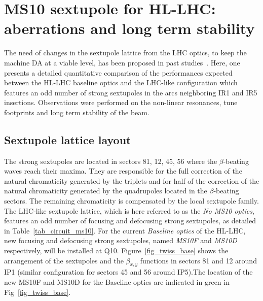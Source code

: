 \documentclass{cernatsnote}
\begin{document}
\section{MS10 sextupole for HL-LHC: aberrations and long term stability} \label{ms10}

The need of changes in the sextupole lattice from the LHC optics, to keep the machine DA at a viable level, has been proposed in past studies~\cite{ats,slhcv3,ms10_ppt1,ms10_ppt2}. Here, one presents a detailed quantitative comparison of the performances expected between the HL-LHC baseline optics and the LHC-like configuration which features an odd number of strong sextupoles in the arcs neighboring IR1 and IR5 insertions. Observations were performed on the non-linear resonances, tune footprints and long term stability of the beam.

\subsection{Sextupole lattice layout}

The strong sextupoles are located in sectors 81, 12, 45, 56 where the $\beta$-beating waves reach their maxima. They are responsible for the full correction of the natural chromaticity generated by the triplets and for half of the correction of the natural chromaticity generated by the quadrupoles located in the $\beta$-beating sectors. The remaining chromaticity is compensated by the local sextupole family. The LHC-like sextupole lattice, which is here referred to as the \textit{No MS10 optics}, features an odd number of focusing and defocusing strong sextupoles, as detailed in Table~\ref{tab_circuit_ms10}. For the current \textit{Baseline optics} of the HL-LHC, new focusing and defocusing strong sextupoles, named \textit{MS10F} and \textit{MS10D} respectively, will be installed at Q10. Figure~\ref{fig_twiss_base} shows the arrangement of the sextupoles and the $\beta_{x,y}$ functions in sectors 81 and 12 around IP1 (similar configuration for sectors 45 and 56 around IP5).The location of the new MS10F and MS10D for the Baseline optics are indicated in green in Fig~\ref{fig_twiss_base}.
\end{document}

